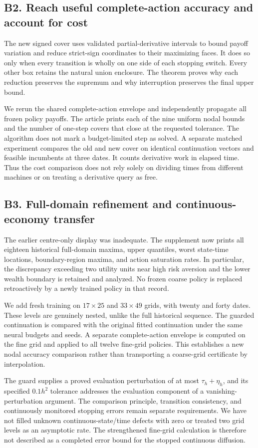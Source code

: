 \subsection*{B2. Reach useful complete-action accuracy and account for cost}
The new signed cover uses validated partial-derivative intervals to bound payoff variation and reduce strict-sign coordinates to their maximizing faces. It does so only when every transition is wholly on one side of each stopping switch. Every other box retains the natural union enclosure. The theorem proves why each reduction preserves the supremum and why interruption preserves the final upper bound.

We rerun the shared complete-action envelope and independently propagate all frozen policy payoffs. The article prints each of the nine uniform nodal bounds and the number of one-step covers that close at the requested tolerance. The algorithm does not mark a budget-limited step as solved. A separate matched experiment compares the old and new cover on identical continuation vectors and feasible incumbents at three dates. It counts derivative work in elapsed time. Thus the cost comparison does not rely solely on dividing times from different machines or on treating a derivative query as free.

\subsection*{B3. Full-domain refinement and continuous-economy transfer}
The earlier centre-only display was inadequate. The supplement now prints all eighteen historical full-domain maxima, upper quantiles, worst state-time locations, boundary-region maxima, and action saturation rates. In particular, the discrepancy exceeding two utility units near high risk aversion and the lower wealth boundary is retained and analyzed. No frozen coarse policy is replaced retroactively by a newly trained policy in that record.

We add fresh training on $17\times25$ and $33\times49$ grids, with twenty and forty dates. These levels are genuinely nested, unlike the full historical sequence. The guarded continuation is compared with the original fitted continuation under the same neural budgets and seeds. A separate complete-action envelope is computed on the fine grid and applied to all twelve fine-grid policies. This establishes a new nodal accuracy comparison rather than transporting a coarse-grid certificate by interpolation.

The guard supplies a proved evaluation perturbation of at most $\tau_h+\eta_h$, and its specified $0.1h^2$ tolerance addresses the evaluation component of a vanishing-perturbation argument. The comparison principle, transition consistency, and continuously monitored stopping errors remain separate requirements. We have not filled unknown continuous-state/time defects with zero or treated two grid levels as an asymptotic rate. The strengthened fine-grid calculation is therefore not described as a completed error bound for the stopped continuous diffusion.

